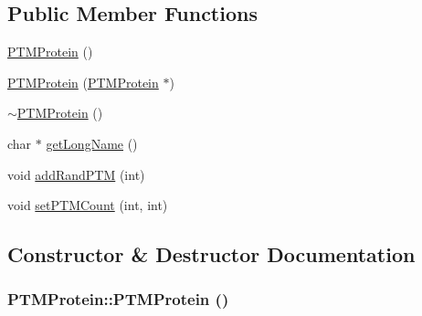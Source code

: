 \subsection*{Public Member Functions}
\begin{DoxyCompactItemize}
\item 
\hyperlink{classPTMProtein_ad7f9e5f107659b4c8a0c675f2aeb7b8b}{PTMProtein} ()
\item 
\hyperlink{classPTMProtein_a6a642aeb0eb0d1ca2a9120922637ca0d}{PTMProtein} (\hyperlink{classPTMProtein}{PTMProtein} $\ast$)
\item 
\hyperlink{classPTMProtein_a1ca801134018861350af3eb36a359b48}{$\sim$PTMProtein} ()
\item 
char $\ast$ \hyperlink{classPTMProtein_a933492fe6252149290b4a2e9885588da}{getLongName} ()
\item 
void \hyperlink{classPTMProtein_a8ffaa9989ec5a1000bf5143f7abb1fff}{addRandPTM} (int)
\item 
void \hyperlink{classPTMProtein_a7ce484e1d24adb5cf50ef07c6004d386}{setPTMCount} (int, int)
\end{DoxyCompactItemize}


\subsection{Constructor \& Destructor Documentation}
\hypertarget{classPTMProtein_ad7f9e5f107659b4c8a0c675f2aeb7b8b}{
\subsubsection[{PTMProtein}]{\setlength{\rightskip}{0pt plus 5cm}PTMProtein::PTMProtein ()}}
\label{classPTMProtein_ad7f9e5f107659b4c8a0c675f2aeb7b8b}


